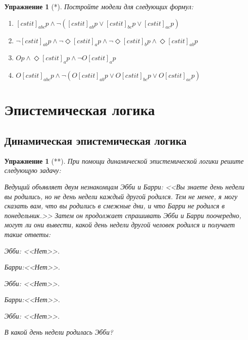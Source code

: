 \documentclass[11pt]{article}
\newtheorem{exercise}[theorem]{Упражнение}
\begin{document}
\begin{exercise}[*]Постройте модели для следующих формул:
\begin{enumerate}
    \item $[cstit]_{abc} p \wedge \neg ([cstit]_{ab} p \vee [cstit]_{bc} p \vee  [cstit]_{ac} p) $
    \item $\neg [cstit]_{ab} p \wedge \neg \Diamond [cstit]_a p \wedge \neg \Diamond [cstit]_b p \wedge \Diamond [cstit]_{ab} p  $
    \item   $Op \wedge \Diamond [cstit]_a p \wedge \neg O[cstit]_a p$
    \item $O [cstit]_{abc} p \wedge \neg (O[cstit]_{ab} p \vee O[cstit]_{bc} p \vee  O[cstit]_{ac} p) $
\end{enumerate}
\end{exercise}


\section{Эпистемическая логика}

\subsection{Динамическая эпистемическая логика}
\begin{exercise}[**] При помощи динамической эпистемической логики решите следующую задачу:
	
Ведущий объявляет двум незнакомцам Эбби и Барри:
<<Вы знаете день недели вы родились, но не день недели каждый другой родился. Тем не менее, я могу сказать вам, что вы родились в смежные дни, и что Барри не родился в
понедельник.>> Затем он продолжает спрашивать Эбби и Барри поочередно, могут ли они вывести, какой день недели другой человек родился и получает такие ответы:

Эбби: <<Нет>>.

Барри:<<Нет>>.

Эбби: <<Нет>>.

Барри:<<Нет>>.

Эбби: <<Нет>>.

\begin{center}
В какой день недели родилась Эбби?	
\end{center}
\end{exercise}
\end{document}

